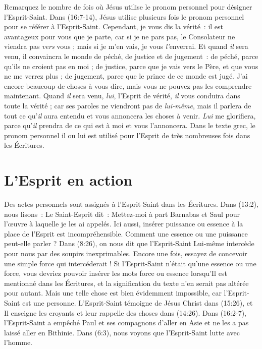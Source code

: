 Remarquez le nombre de fois où Jésus utilise le pronom personnel pour
 désigner l'Esprit-Saint. Dans (16:7-14), Jésus utilise
 plusieurs fois le pronom personnel pour se référer à l'Esprit-Saint.
 \og Cependant, je vous dis la vérité~: il est avantageux pour vous
 que je parte, car si je ne pars pas, le Consolateur ne viendra pas
 \emph{vers} vous ; mais si je m'en vais, je vous \emph{l'}enverrai.
 Et quand \emph{il} sera venu, il convaincra le monde de péché,
 de justice et de jugement~: de péché, parce qu'ils ne croient pas en moi ;
 de justice, parce que je vais vers le Père, et que vous ne me verrez plus ;
 de jugement, parce que le prince de ce monde est jugé.
 J'ai encore beaucoup de choses à vous dire, mais vous ne pouvez pas
 les comprendre maintenant. Quand \emph{il} sera venu, \emph{lui},
 l'Esprit de vérité, \emph{il} vous conduira dans toute la vérité ;
 car ses paroles ne viendront pas de \emph{lui-même}, mais il parlera de
 tout ce qu'\emph{il} aura entendu et vous annoncera les choses à venir.
 \emph{Lui} me glorifiera, parce qu'\emph{il} prendra de ce qui est à moi
 et vous l'annoncera. \fg{}
 Dans le texte grec, le pronom personnel \og il \fg{} ou \og lui \fg{}
 est utilisé pour l'Esprit de très nombreuses fois dans les Écritures.

\section{L'Esprit en action}

\begin{specialpar}{}
Des actes personnels sont assignés à l'Esprit-Saint dans les \linebreak
 Écritures. Dans (13:2), nous lisons~: \og Le Saint-Esprit dit~:
 Mettez-moi à part Barnabas et Saul pour l'œuvre à laquelle je les ai
 appelés. \fg{}
 Ici aussi, insérer \og puissance \fg{} ou \og essence \fg{} à la place
 de l'Esprit est incompréhensible. Comment une essence ou une puissance
 peut-elle parler ? Dans (8:26), on nous dit que l'Esprit-Saint
 Lui-même intercède pour nous par des soupirs inexprimables.
 Encore une fois, essayez de concevoir une simple force qui intercéderait !
 Si l'Esprit-Saint n'était qu'une essence ou une force, vous devriez pouvoir
 insérer les mots \og force \fg{} ou \og essence \fg{} lorsqu'Il est mentionné
 dans les Écritures, et la signification du texte n'en serait pas altérée pour
 autant. Mais une telle chose est bien évidemment impossible, car
 l'Esprit-Saint est une personne. L'Esprit-Saint témoigne de Jésus Christ dans
 (15:26), et Il enseigne les croyants et leur rappelle des choses
 dans (14:26). Dans (16:2-7), l'Esprit-Saint a
 empêché Paul et ses compagnons d'aller en Asie et ne les a pas laissé aller
 en Bithinie. Dans (6:3), nous voyons que l'Esprit-Saint lutte
 avec l'homme.
\end{specialpar}


